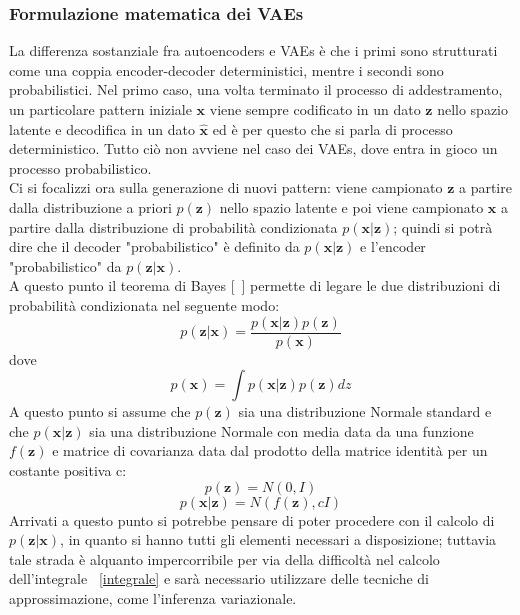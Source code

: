 \subsubsection{Formulazione matematica dei VAEs}
La differenza sostanziale fra autoencoders e VAEs è che i primi sono strutturati come una coppia encoder-decoder deterministici, mentre i secondi sono probabilistici. Nel primo caso, una volta terminato il processo di addestramento, un particolare pattern iniziale $\textbf{x}$ viene sempre codificato in un dato $\textbf{z}$ nello spazio latente e decodifica in un dato $\hat{\textbf{x}}$ ed è per questo che si parla di processo deterministico. Tutto ciò non avviene nel caso dei VAEs, dove entra in gioco un processo probabilistico. \\
Ci si focalizzi ora sulla generazione di nuovi pattern: viene campionato $\textbf{z}$ a partire dalla distribuzione a priori $p(\textbf{z})$ nello spazio latente e poi viene campionato $\textbf{x}$ a partire dalla distribuzione di probabilità condizionata $p(\textbf{x}|\textbf{z})$; quindi si potrà dire che il decoder "probabilistico" è definito da $p(\textbf{x}|\textbf{z})$ e l'encoder "probabilistico" da $p(\textbf{z}|\textbf{x})$. \\
A questo punto il teorema di Bayes [~\cite{Statistica}] permette di legare le due distribuzioni di probabilità condizionata nel seguente modo:
\begin{equation}
	p(\textbf{z}|\textbf{x}) = \frac{p(\textbf{x}|\textbf{z}) p(\textbf{z})}{p(\textbf{x})}
\end{equation}
dove
\begin{equation}
	p(\textbf{x}) = \int p(\textbf{x}|\textbf{z}) p(\textbf{z}) dz
	\label{integrale}
\end{equation}
A questo punto si assume che $p(\textbf{z})$ sia una distribuzione Normale standard e che $p(\textbf{x}|\textbf{z})$ sia una distribuzione Normale con media data da una funzione $f(\textbf{z})$ e matrice di covarianza data dal prodotto della matrice identità per un costante positiva c:
\begin{equation}
	p(\textbf{z}) = N(0,I) 
\end{equation}
\begin{equation}
p(\textbf{x}|\textbf{z}) = N(f(\textbf{z}),cI)
\end{equation}
Arrivati a questo punto si potrebbe pensare di poter procedere con il calcolo di $p(\textbf{z}|\textbf{x})$, in quanto si hanno tutti gli elementi necessari a disposizione; tuttavia tale strada è alquanto impercorribile per via della difficoltà nel calcolo dell'integrale ~\ref{integrale} e sarà necessario utilizzare delle tecniche di approssimazione, come l'inferenza variazionale.

\newpage